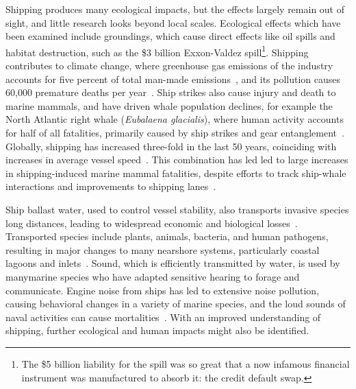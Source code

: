 Shipping produces many ecological impacts, but the effects largely remain out of sight, and little research looks beyond local scales. Ecological effects which have been examined include groundings, which cause direct effects like oil spills and habitat destruction, such as the \$3 billion Exxon-Valdez spill\footnote{The \$5 billion liability for the spill was so great that a now infamous financial instrument was manufactured to absorb it: the credit default swap.}.  Shipping contributes to climate change, where greenhouse gas emissions of the industry accounts for five percent of total man-made emissions~\citep{Eyring2009}, and its pollution causes 60,000 premature deaths per year~\citep{Corbett2007}.  Ship strikes also cause injury and death to marine mammals, and have driven whale population declines, for example the North Atlantic right whale (\textit{Eubalaena glacialis}), where human activity accounts for half of all fatalities, primarily caused by ship strikes and gear entanglement~\citep{Moore2007}. Globally, shipping has increased three-fold in the last 50 years, coinciding with increases in average vessel speed~\citep{Vanderlaan2009}. This combination has led led to large increases in shipping-induced marine mammal fatalities, despite efforts to track ship-whale interactions \citep{jensen2004large} and improvements to shipping lanes~\citep{Lagueux2011,Mckenna2012a}.

Ship ballast water, used to control vessel stability, also transports invasive species long distances, leading to widespread economic and biological losses~\citep{Ruiz2000,Rodrigue2009}. Transported species include plants, animals, bacteria, and human pathogens, resulting in major changes to many nearshore systems, particularly coastal lagoons and inlets~\citep{leppakoski2002baltic}.  Sound, which is efficiently transmitted by water, is used by manymarine species who have adapted sensitive hearing to forage and communicate. Engine noise from ships has led to extensive noise pollution, causing behavioral changes in a variety of marine species, and the loud sounds of naval activities can cause mortalities~\citep{Hatch2009}. With an improved understanding of shipping, further ecological and human impacts might also be identified.


